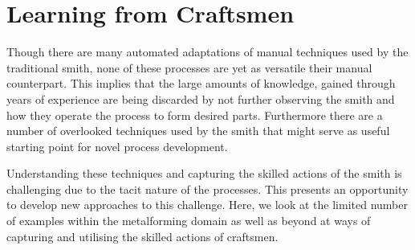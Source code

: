 





\newpage
\section{Learning from Craftsmen} \label{sec:Learning}

Though there are many automated adaptations of manual techniques used by the traditional smith, none of these processes are yet as versatile their manual counterpart. This implies that the large amounts of knowledge, gained through years of experience are being discarded by not further observing the smith and how they operate the process to form desired parts. Furthermore there are a number of overlooked techniques used by the smith that might serve as useful starting point for novel process development.

Understanding these techniques and capturing the skilled actions of the smith is challenging due to the tacit nature of the processes. This presents an opportunity to develop new approaches to this challenge. Here, we look at the limited number of examples within the metalforming domain as well as beyond at ways of capturing and utilising the skilled actions of craftsmen.

